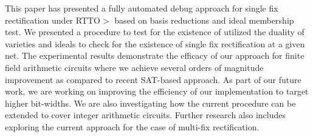 This paper has presented a fully automated debug approach for single fix rectification under RTTO$>$ based on \Grobner basis reductions and ideal
membership test. We presented a procedure to test for the existence of utilized the duality of varieties and ideals to check for the existence of single fix rectification at a given net. 
The experimental results demonstrate the efficacy of our approach for finite field arithmetic circuits where we achieve several orders of magnitude
improvement as compared to recent SAT-based approach. 
As part of our future work, we are working on improving the efficiency of our implementation to target higher bit-widths. We are also investigating how the current procedure can be extended to cover integer arithmetic circuits.
Further research also includes exploring the current approach for
the case of multi-fix rectification.  
